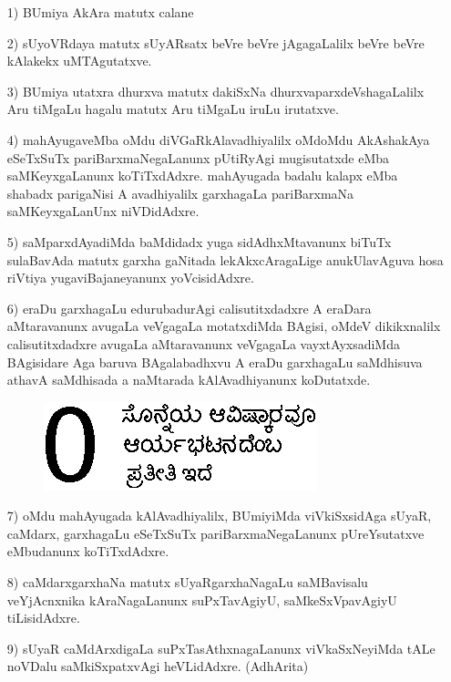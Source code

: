\begin{itemize}
\item[{\rm 1)}] BUmiya AkAra matutx calane
  
\item[{\rm 2)}] sUyoVRdaya matutx sUyARsatx beVre beVre jAgagaLalilx beVre beVre kAlakekx uMTAgutatxve.
  
\item[{\rm 3)}] BUmiya utatxra dhurxva matutx dakiSxNa dhurxvaparxdeVshagaLalilx Aru tiMgaLu hagalu matutx Aru tiMgaLu iruLu irutatxve.

\item[{\rm 4)}] mahAyugaveMba oMdu diVGaRkAlavadhiyalilx oMdoMdu AkAshakAya eSeTxSuTx pariBarxmaNegaLanunx pUtiRyAgi mugisutatxde eMba saMKeyxgaLanunx koTiTxdAdxre. mahAyugada badalu kalapx eMba shabadx parigaNisi A avadhiyalilx garxhagaLa pariBarxmaNa saMKeyxgaLanUnx niVDidAdxre. 

\item[{\rm 5)}] saMparxdAyadiMda baMdidadx yuga sidAdhxMtavanunx biTuTx sulaBavAda matutx garxha gaNitada lekAkxcAragaLige anukUlavAguva hosa riVtiya yugaviBajaneyanunx yoVcisidAdxre. 

\item[{\rm 6)}] eraDu garxhagaLu edurubadurAgi calisutitxdadxre A eraDara aMtaravanunx avugaLa veVgagaLa motatxdiMda BAgisi, oMdeV dikikxnalilx calisutitxdadxre avugaLa aMtaravanunx veVgagaLa vayxtAyxsadiMda BAgisidare Aga baruva BAgalabadhxvu A eraDu garxhagaLu saMdhisuva athavA saMdhisada a naMtarada kAlAvadhiyanunx koDutatxde.
\begin{figure}[H]
\centering
\includegraphics[scale=0.8]{src/figures/fig17.eps}
\end{figure}
   
  
\item[{\rm 7)}] oMdu mahAyugada kAlAvadhiyalilx, BUmiyiMda viVkiSxsidAga sUyaR, caMdarx, garxhagaLu eSeTxSuTx pariBarxmaNegaLanunx pUreYsutatxve eMbudanunx koTiTxdAdxre. 


\item[{\rm 8)}] caMdarxgarxhaNa matutx sUyaRgarxhaNagaLu saMBavisalu veYjAcnxnika kAraNa\-gaLanunx suPxTavAgiyU, saMkeSxVpavAgiyU tiLisidAdxre. 
  
\item[{\rm 9)}] sUyaR caMdArxdigaLa suPxTasAthxnagaLanunx viVkaSxNeyiMda tALe noVDalu saMkiSxpatxvAgi heVLidAdxre. \hfill{(AdhArita)}
\end{itemize}
